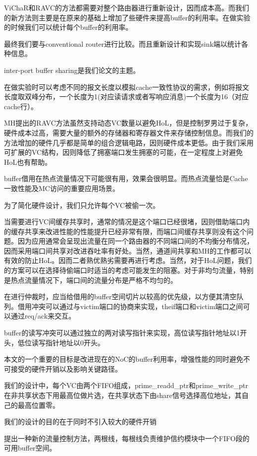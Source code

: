 ﻿\documentclass[10pt,journal]{IEEEtran}
\begin{document}
ViChaR和RAVC的方法都需要对整个路由器进行重新设计，因而成本高。而我们的新方法则主要是在原来的基础上增加了些硬件来提高buffer的利用率。在做实验的时候我们可以统计每个buffer的利用率。

最终我们要与conventional router进行比较。而且重新设计和实现sink端以统计各种信息。

inter-port buffer sharing是我们论文的主题。

在做实验时可以考虑不同的报文长度以模拟cache一致性协议的需求，例如将报文长度取双峰分布，一个长度为1(对应读请求或者写响应消息)一个长度为16（对应cache行）。

MH提出的RAVC方法虽然支持动态VC数量以避免HoL，但是控制罗男过于复杂，硬件成本过高，需要大量的额外的存储器和寄存器文件来存储控制信息。而我们的方法增加的硬件几乎都是简单的组合逻辑电路，因则硬件成本更低。由于我们采用可扩展的VC结构，因则降低了拥塞端口发生拥塞的可能，在一定程度上对避免HoL也有帮助。

buffer借用在热点流量情况下可能很有用，效果会很明显。而热点流量恰是Cache一致性能及MC访问的重要应用场景。

为了简化硬件设计，我们只允许每个VC被偷一次。

当需要进行VC间缓存共享时，通常的情况是这个端口已经很堵，因则借助端口内的缓存共享来改进性能的性能提升已经非常有限，而端口间缓存共享则没有这个问题。因为应用通常会呈现出流量在同一个路由器的不同端口间的不均衡分布情况，因而采用端口间共享对改进吞吐率有好处。当然，通道间共享和MH的工作都可以有效的防止HoL。因而二者熟优熟劣需要再进行考虑。当然，对于HoL问题，我们的方案可以在选择待偷端口时适当的考虑可能发生的阻塞。对于非均匀流量，特别是热点流量情况下，端口间的流量分布是严格不均匀的。

在进行仲裁时，应当给借用的buffer空间切片以较高的优先级，以方便其清空队列。借用冲突可以通过与victim端口的协商来实现，theif端口和victim端口之间可以通过req/ack来交互。

buffer的读写冲突可以通过独立的两对读写指针来实现，高位读写指针地址以1开头，低位读写指针地址以0开头。

本文的一个重要的目标是改进现在的NoC的buffer利用率，增强性能的同时避免不可接受的硬件开销以及影响关键路径。

我们的设计中，每个VC由两个FIFO组成，prime\_readd\_ptr和prime\_write\_ptr在非共享状态下用最高位做片选，在共享状态下由share信号选择高位地址，其自己的最高位置零。

我们的设计的目的在于同时不引入较大的硬件开销

提出一种新的流量控制方法，两根线，每根线负责维护信约模块中一个FIFO段的可用buffer空间。
\end{document}
